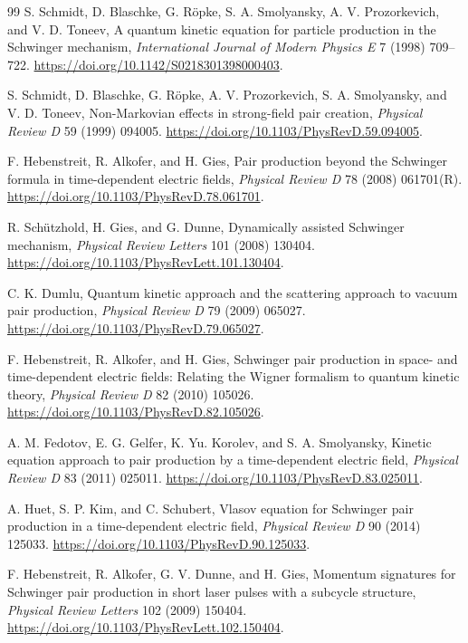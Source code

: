 \documentclass[a4paper,fleqn]{cas-dc}
\begin{document}
\begin{thebibliography}{99}
S. Schmidt, D. Blaschke, G. R\"opke, S. A. Smolyansky, A. V. Prozorkevich, and V. D. Toneev, A quantum kinetic equation for particle production in the Schwinger mechanism, \textit{International Journal of Modern Physics E} 7 (1998) 709--722. \url{https://doi.org/10.1142/S0218301398000403}.

S. Schmidt, D. Blaschke, G. R\"opke, A. V. Prozorkevich, S. A. Smolyansky, and V. D. Toneev, Non-Markovian effects in strong-field pair creation, \textit{Physical Review D} 59 (1999) 094005. \url{https://doi.org/10.1103/PhysRevD.59.094005}.

F. Hebenstreit, R. Alkofer, and H. Gies, Pair production beyond the Schwinger formula in time-dependent electric fields, \textit{Physical Review D} 78 (2008) 061701(R). \url{https://doi.org/10.1103/PhysRevD.78.061701}.

R. Sch\"utzhold, H. Gies, and G. Dunne, Dynamically assisted Schwinger mechanism, \textit{Physical Review Letters} 101 (2008) 130404. \url{https://doi.org/10.1103/PhysRevLett.101.130404}.

C. K. Dumlu, Quantum kinetic approach and the scattering approach to vacuum pair production, \textit{Physical Review D} 79 (2009) 065027. \url{https://doi.org/10.1103/PhysRevD.79.065027}.

F. Hebenstreit, R. Alkofer, and H. Gies, Schwinger pair production in space- and time-dependent electric fields: Relating the Wigner formalism to quantum kinetic theory, \textit{Physical Review D} 82 (2010) 105026. \url{https://doi.org/10.1103/PhysRevD.82.105026}.

A. M. Fedotov, E. G. Gelfer, K. Yu. Korolev, and S. A. Smolyansky, Kinetic equation approach to pair production by a time-dependent electric field, \textit{Physical Review D} 83 (2011) 025011. \url{https://doi.org/10.1103/PhysRevD.83.025011}.

A. Huet, S. P. Kim, and C. Schubert, Vlasov equation for Schwinger pair production in a time-dependent electric field, \textit{Physical Review D} 90 (2014) 125033. \url{https://doi.org/10.1103/PhysRevD.90.125033}.

F. Hebenstreit, R. Alkofer, G. V. Dunne, and H. Gies, Momentum signatures for Schwinger pair production in short laser pulses with a subcycle structure, \textit{Physical Review Letters} 102 (2009) 150404. \url{https://doi.org/10.1103/PhysRevLett.102.150404}.


\end{thebibliography}
\end{document}
